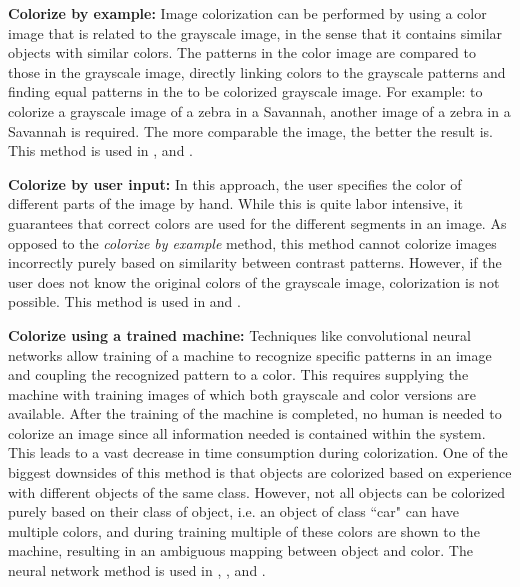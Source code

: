 \textbf{Colorize by example:} Image colorization can be performed by using a color image that is related to the grayscale image, in the sense that it contains similar objects with similar colors. The patterns in the color image are compared to those in the grayscale image, directly linking colors to the grayscale patterns and finding equal patterns in the to be colorized grayscale image. 
For example: to colorize a grayscale image of a zebra in a Savannah, another image of a zebra in a Savannah is required. The more comparable the image, the better the result is. This method is used in \cite{Charpiat}, \cite{Gupta} and \cite{Zheng}.

\textbf{Colorize by user input:} In this approach, the user specifies the color of different parts of the image by hand. While this is quite labor intensive, it guarantees that correct colors are used for the different segments in an image. 
As opposed to the \textit{colorize by example} method, this method cannot colorize images incorrectly purely based on similarity between contrast patterns. However, if the user does not know the original colors of the grayscale image, colorization is not possible. This method is used in \cite{Horiuchi} and \cite{Levin}.

\textbf{Colorize using a trained machine:} Techniques like convolutional neural networks allow training of a machine to recognize specific patterns in an image and coupling the recognized pattern to a color. This requires supplying the machine with training images of which both grayscale and color versions are available. 
After the training of the machine is completed, no human is needed to colorize an image since all information needed is contained within the system. This leads to a vast decrease in time consumption during colorization. One of the biggest downsides of this method is that objects are colorized based on experience with different objects of the same class. 
However, not all objects can be colorized purely based on their class of object, i.e. an object of class ``car" can have multiple colors, and during training multiple of these colors are shown to the machine, resulting in an ambiguous mapping between object and color. The neural network method is used in \cite{Cheng}, \cite{Ho}, \cite{Krizhevsky} and \cite{Dahl}.\\

